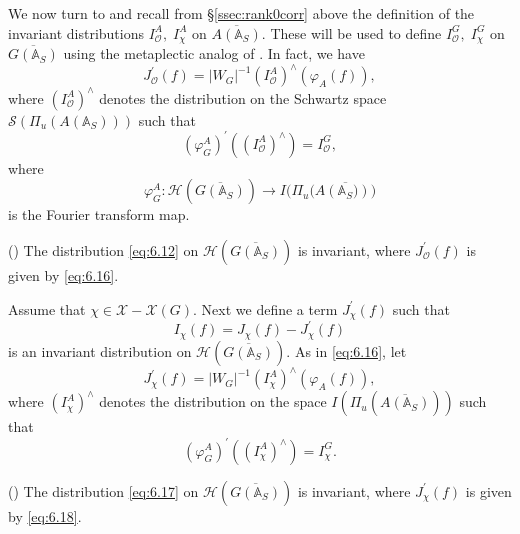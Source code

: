 We now turn to \cite[section 4]{A6} and recall from \S\ref{ssec:rank0corr} above  the
definition of the invariant distributions
$I_{{\mathcal{O}}}^A,\;I_\chi ^A$ on $\overline{A({\mathbb{A}}_S)}$.
These will be used to define $I_{{\mathcal{O}}}^G,\;I_\chi ^G$ on 
$\overline{G({\mathbb{A}}_S)}$ using the metaplectic analog of
\cite[Proposition 4.1 and its proof]{A6}. In fact, we
have 
\begin{equation}\label{eq:6.16}
J_{{\mathcal{O}}}^{\prime }(f)
=|W_G|^{-1}(I_{{\mathcal{O}}}^A)^{\wedge }(\varphi_A(f)),
\end{equation}
where $(I_{{\mathcal{O}}}^A)^{\wedge }$ denotes the distribution on the
Schwartz space ${\mathcal{S}}(\Pi _u(A({\mathbb {A}}_S)))$ such that 
\[
(\varphi _G^A)^{\prime }((I_{\mathcal{O}}^A)^{\wedge })=I_{\mathcal{O}}^G, 
\]
where 
\[
\varphi_G^A:{\mathcal{H}}(\overline{G({\mathbb {A}}_S)})\rightarrow
I(\Pi _u(\overline{A({\mathbb {A}_S)})) }
\]
is the Fourier transform map.

\begin{proposition}\label{prop:6.15}
(\cite[Introduction and Proposition 4.1]{A6}) The distribution
\eqref{eq:6.12} on ${\mathcal{H}}(\overline{G({\mathbb{A}}_S)})$ is invariant,
where $J_{\mathcal{O}}^{\prime }(f)$ is given
by \eqref{eq:6.16}.
\end{proposition}

Assume that ${\chi }\in {\mathcal{X}}-{\mathcal{X}}(G)$.
Next we define a term $J_{{ \chi }}^{\prime }(f)$ such that 
\begin{equation}\label{eq:6.17}
I_{{\chi }}(f)=J_{{\chi }}(f)-J_{{\chi }}^{\prime }(f)
\end{equation}
is an invariant distribution on
${\mathcal{H}}(\overline{G({\mathbb{A}}_S)})$.
As in \eqref{eq:6.16}, let 
\begin{equation}\label{eq:6.18}
J_{{\chi }}^{\prime }(f)=|W_G|^{-1}(I_{{\chi }}^A)^{\wedge
}(\varphi _A(f)),
\end{equation}
where $(I_{{\chi }}^A)^{\wedge }$ denotes the distribution on the
space $I(\Pi _u(\overline{A({\mathbb {A}}_S)}))$ such that 
\[
(\varphi _G^A)^{\prime }((I_{{\chi }}^A)^{\wedge })=I_{{\chi }}^G. 
\]

\begin{proposition}\label{prop:6.16}
(\cite[Introduction and Proposition 4.1]{A6}) The distribution \eqref{eq:6.17}
on ${\mathcal{H}}(\overline{G({\mathbb{A}}_S)})$ is invariant,
where $J_{{\chi }}^{\prime }(f)$ is
given by \eqref{eq:6.18}.
\end{proposition}

